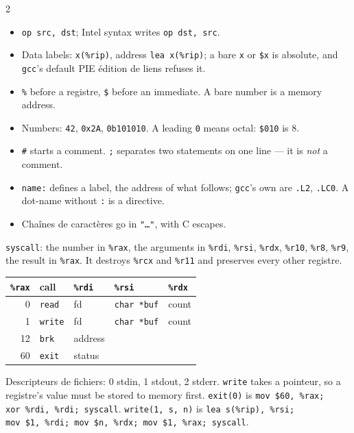 \begin{multicols}{2}
\begin{itemize}[nosep, leftmargin=10pt]
  \item \texttt{op src, dst}; Intel syntax writes \texttt{op dst, src}.
  \item Data labels: \texttt{x(\%rip)}, address \texttt{lea x(\%rip)}; a bare \texttt{x} or \texttt{\$x} is
    absolute, and \texttt{gcc}'s default PIE édition de liens refuses it.
  \item \texttt{\%} before a registre, \texttt{\$} before an immediate. A bare
    number is a memory address.
  \item Numbers: \texttt{42}, \texttt{0x2A}, \texttt{0b101010}. A leading
    \texttt{0} means octal: \texttt{\$010} is 8.
  \item \texttt{\#} starts a comment. \texttt{;} separates two statements on one
    line --- it is \emph{not} a comment.
  \item \texttt{name:} defines a label, the address of what follows; \texttt{gcc}'s own
    are \texttt{.L2}, \texttt{.LC0}. A dot-name without \texttt{:} is a directive.
  \item Chaînes de caractères go in \texttt{"\dots"}, with C escapes.
\end{itemize}

\texttt{syscall}: the number in \texttt{\%rax}, the arguments in \texttt{\%rdi},
\texttt{\%rsi}, \texttt{\%rdx}, \texttt{\%r10}, \texttt{\%r8}, \texttt{\%r9}, the
result in \texttt{\%rax}. It destroys \texttt{\%rcx} and \texttt{\%r11} and
preserves every other registre.

\smallskip
\begin{tabularx}{\linewidth}{@{}rlllX@{}}
\toprule
\texttt{\%rax} & call & \texttt{\%rdi} & \texttt{\%rsi} & \texttt{\%rdx} \\
\midrule
0  & \texttt{read}  & fd      & \texttt{char *buf} & count \\
1  & \texttt{write} & fd      & \texttt{char *buf} & count \\
12 & \texttt{brk}   & address &                    & \\
60 & \texttt{exit}  & status  &                    & \\
\bottomrule
\end{tabularx}
Descripteurs de fichiers: 0 stdin, 1 stdout, 2
stderr. \texttt{write} takes a pointeur, so a registre's value must be stored to
memory first. \texttt{exit(0)} is \texttt{mov~\$60,~\%rax; xor~\%rdi,~\%rdi;
syscall}. \texttt{write(1, s, n)} is \texttt{lea~s(\%rip),~\%rsi; mov~\$1,~\%rdi;
mov~\$n,~\%rdx; mov~\$1,~\%rax; syscall}.


\end{multicols}
